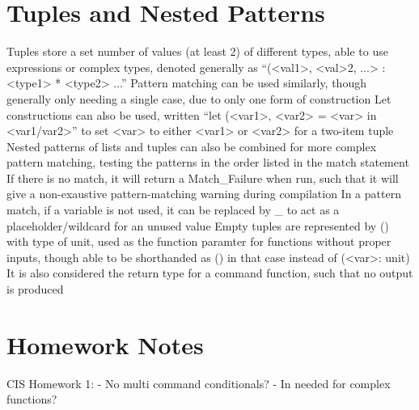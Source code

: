 \documentclass[11 pt, twoside]{article}
\newenvironment{outline*}
{
	\begin{outline}[enumerate]
	}
	{\end{outline}
}
\begin{document}
\section{Tuples and Nested Patterns}
\begin{outline*}
\1 Tuples store a set number of values (at least 2) of different types, able to use expressions or complex types, denoted generally as ``(<val1>, <val>2, ...> : <type1> * <type2> ...''
\2 Pattern matching can be used similarly, though generally only needing a single case, due to only one form of construction
\3 Let constructions can also be used, written ``let (<var1>, <var2> = <var> in <var1/var2>'' to set <var> to either <var1> or <var2> for a two-item tuple
\3 Nested patterns of lists and tuples can also be combined for more complex pattern matching, testing the patterns in the order listed in the match statement
\3 If there is no match, it will return a Match_Failure when run, such that it will give a non-exaustive pattern-matching warning during compilation
\3 In a pattern match, if a variable is not used, it can be replaced by \_ to act as a placeholder/wildcard for an unused value
\2 Empty tuples are represented by () with type of unit, used as the function paramter for functions without proper inputs, though able to be shorthanded as () in that case instead of (<var>: unit)
\3 It is also considered the return type for a command function, such that no output is produced
\end{outline*}
\section{Homework Notes}
CIS Homework 1:
- No multi command conditionals?
- In needed for complex functions?
\end{document}

